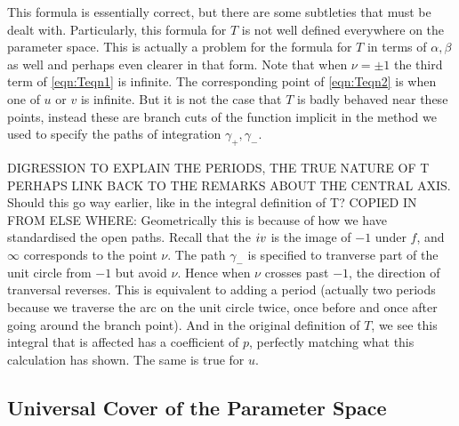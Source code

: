 This formula is essentially correct, but there are some subtleties that must be dealt with. Particularly, this formula for $T$ is not well defined everywhere on the parameter space. This is actually a problem for the formula for $T$ in terms of $α, β$ as well and perhaps even clearer in that form. Note that when $ν = \pm 1$ the third term of \ref{eqn:Teqn1} is infinite. The corresponding point of \ref{eqn:Teqn2} is when one of $u$ or $v$ is infinite. But it is not the case that $T$ is badly behaved near these points, instead these are branch cuts of the function implicit in the method we used to specify the paths of integration $γ_+, γ_-$.

DIGRESSION TO EXPLAIN THE PERIODS, THE TRUE NATURE OF T PERHAPS LINK BACK TO THE REMARKS ABOUT THE CENTRAL AXIS. Should this go way earlier, like in the integral definition of T?
COPIED IN FROM ELSE WHERE: Geometrically this is because of how we have standardised the open paths. Recall that the $i v$ is the image of $-1$ under $f$, and $\infty$ corresponds to the point $ν$. The path $γ_-$ is specified to tranverse part of the unit circle from $-1$ but avoid $ν$. Hence when $ν$ crosses past $-1$, the direction of tranversal reverses. This is equivalent to adding a period (actually two periods because we traverse the arc on the unit circle twice, once before and once after going around the branch point). And in the original definition of $T$, we see this integral that is affected has a coefficient of $p$, perfectly matching what this calculation has shown. The same is true for $u$. 












\subsection{Universal Cover of the Parameter Space}

